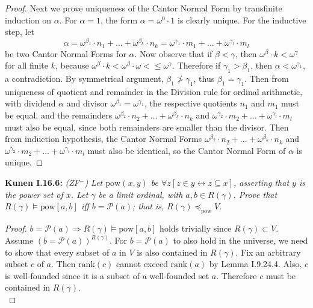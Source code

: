 \documentclass{article}
\begin{document}
\begin{proof}
    Next we prove uniqueness of the Cantor Normal Form by transfinite
    induction on $\alpha$. For $\alpha=1$, the form $\alpha=\omega^0\cdot1$
    is clearly unique. For the inductive step, let
    \[\alpha =\omega^{\beta_1}\cdot n_1 +\ldots +\omega^{\beta_k}\cdot
    n_k =\omega^{\gamma_1}\cdot m_1 +\ldots +\omega^{\gamma_l}\cdot
    m_l\]
    be two Cantor Normal Forms for $\alpha$. Now observe that if
    $\beta<\gamma$, then $\omega^\beta\cdot k<\omega^\gamma$ for all finite
    $k$, because $\omega^\beta\cdot k<\omega^\beta\cdot\omega
    <\leq\omega^\gamma$. Therefore if $\gamma_1>\beta_1$, then
    $\alpha<\omega^{\gamma_1}$, a contradiction. By symmetrical argument,
    $\beta_1\not>\gamma_1$, thus $\beta_1=\gamma_1$. Then from uniqueness
    of quotient and remainder in the Division rule for ordinal arithmetic,
    with dividend $\alpha$ and divisor $\omega^{\beta_1}=\omega^{\gamma_1}$,
    the respective quotients $n_1$ and $m_1$ must be equal, and the
    remainders $\omega^{\beta_2}\cdot n_2 +\ldots +\omega^{\beta_k}\cdot
    n_k$ and $\omega^{\gamma_2}\cdot m_2 +\ldots +\omega^{\gamma_l}\cdot
    m_l$ must also be equal, since both remainders are smaller than the
    divisor. Then from induction hypothesis, the Cantor Normal Forms
    $\omega^{\beta_2}\cdot n_2 +\ldots +\omega^{\beta_k}\cdot
    n_k$ and $\omega^{\gamma_2}\cdot m_2 +\ldots +\omega^{\gamma_l}\cdot
    m_l$ must also be identical, so the Cantor Normal Form of $\alpha$ is
    unique.
  \end{proof}

\textbf{Kunen I.16.6:} \it (ZF$^-$) Let $\text{pow}(x,y)$ be $\forall z
  [z\in y \leftrightarrow z\subseteq x]$, asserting that $y$ is the power
  set of $x$. Let $\gamma$ be a limit ordinal, with $a,b\in R(\gamma)$.
  Prove that $R(\gamma) \models\text{pow}[a,b]$ iff $b=\mathcal{P}(a)$;
  that is, $R(\gamma) \preceq_{\text{pow}} V$.

  \begin{proof}
    $b=\mathcal{P}(a) \Rightarrow R(\gamma) \models\text{pow}[a,b]$ holds
    trivially since $R(\gamma)\subset V$. Assume
    $(b=\mathcal{P}(a))^{R(\gamma)}$. For $b=\mathcal{P}(a)$ to also hold
    in the universe, we need to show that every subset of $a$ in $V$ is
    also contained in $R(\gamma)$. Fix an arbitrary subset $c$ of $a$. Then
    $\text{rank}(c)$ cannot exceed $\text{rank}(a)$ by Lemma I.9.24.4.
    Also, $c$ is well-founded since it is a subset of a well-founded set
    $a$. Therefore $c$ must be contained in $R(\gamma)$. \\
  \end{proof}
\end{document}
